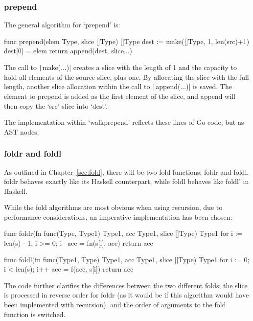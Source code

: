 \subsubsection{prepend}

The general algorithm for `prepend' is:
\begin{code}
    \begin{gocode}
func prepend(elem Type, slice []Type) []Type {
    dest := make([]Type, 1, len(src)+1)
    dest[0] = elem
    return append(dest, slice...)
}
    \end{gocode}
\end{code}
The call to \texttt|make(...)| creates a slice with the length of 1 and the capacity
to hold all elements of the source slice, plus one. By allocating the slice with the full
length, another slice allocation within the call to \texttt|append(...)| is saved.
The element to prepend is added as the first element of the slice, and append will then
copy the `src' slice into `dest'.

The implementation within `walkprepend' reflects these lines of Go code, but
as AST nodes:

\begin{code}
\end{code}
\subsubsection{foldr and foldl}

As outlined in Chapter~\ref{sec:fold}, there will be two fold functions;
foldr and foldl. foldr behaves exactly like its Haskell counterpart,
while foldl behaves like foldl' in Haskell.

While the fold algorithms are most obvious when using recursion, due to
performance considerations, an imperative implementation has been chosen:

\begin{code}
    \begin{gocode}
func foldr(fn func(Type, Type1) Type1, acc Type1, slice []Type) Type1 {
    for i := len(s) - 1; i >= 0; i-- {
        acc = fn(s[i], acc)
    }
    return acc
}

func foldl(fn func(Type1, Type) Type1, acc Type1, slice []Type) Type1 {
    for i := 0; i < len(s); i++ {
        acc = f(acc, s[i])
    }
    return acc
}
\end{gocode}
\end{code}
The code further clarifies the differences between the two different folds;
the slice is processed in reverse order for foldr (as it would be if this
algorithm would have been implemented with recursion), and the order of
arguments to the fold function is switched.

